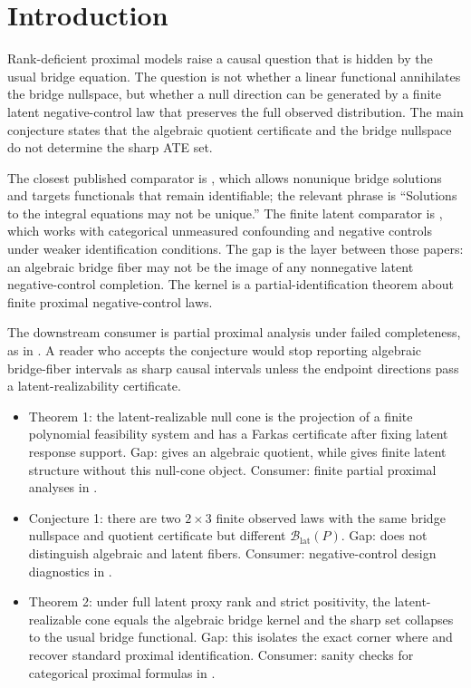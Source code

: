 \documentclass[11pt]{article}
\theoremstyle{definition}
\theoremstyle{plain}
\theoremstyle{remark}
\begin{document}
\section{Introduction}
Rank-deficient proximal models raise a causal question that is hidden by the usual bridge equation. The question is not whether a linear functional annihilates the bridge nullspace, but whether a null direction can be generated by a finite latent negative-control law that preserves the full observed distribution. The main conjecture states that the algebraic quotient certificate and the bridge nullspace do not determine the sharp ATE set.

The closest published comparator is \citet[Abstract and Section 2]{zhang2023proximalNonunique}, which allows nonunique bridge solutions and targets functionals that remain identifiable; the relevant phrase is ``Solutions to the integral equations may not be unique.'' The finite latent comparator is \citet[Abstract and Section 3]{shi2020multiplyRobustDNC}, which works with categorical unmeasured confounding and negative controls under weaker identification conditions. The gap is the layer between those papers: an algebraic bridge fiber may not be the image of any nonnegative latent negative-control completion. The kernel is a partial-identification theorem about finite proximal negative-control laws.

The downstream consumer is partial proximal analysis under failed completeness, as in \citet{ghassami2024partialProxy}. A reader who accepts the conjecture would stop reporting algebraic bridge-fiber intervals as sharp causal intervals unless the endpoint directions pass a latent-realizability certificate.

\begin{itemize}[leftmargin=2em]
\item Theorem 1: the latent-realizable null cone is the projection of a finite polynomial feasibility system and has a Farkas certificate after fixing latent response support. Gap: \citet{zhang2023proximalNonunique} gives an algebraic quotient, while \citet{shi2020multiplyRobustDNC} gives finite latent structure without this null-cone object. Consumer: finite partial proximal analyses in \citet{ghassami2024partialProxy}.
\item Conjecture 1: there are two \(2\times3\) finite observed laws with the same bridge nullspace and quotient certificate but different \(\mathcal{B}_{\mathrm{lat}}(P)\). Gap: \citet{zhang2023proximalNonunique} does not distinguish algebraic and latent fibers. Consumer: negative-control design diagnostics in \citet{zivich2023introducingPCI}.
\item Theorem 2: under full latent proxy rank and strict positivity, the latent-realizable cone equals the algebraic bridge kernel and the sharp set collapses to the usual bridge functional. Gap: this isolates the exact corner where \citet{miao2018proxyVariables} and \citet{miao2024confoundingBridge} recover standard proximal identification. Consumer: sanity checks for categorical proximal formulas in \citet{shi2020multiplyRobustDNC}.
\end{itemize}
\end{document}
